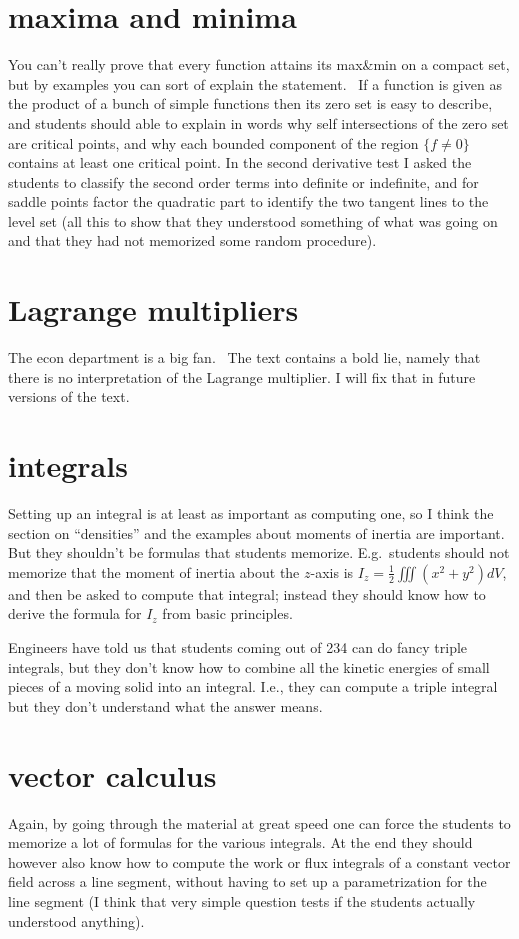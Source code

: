\documentclass[11pt]{amsbook}
\begin{document}
\section*{maxima and minima}
You can't really prove that every function attains its max\&min on a compact set,
but by examples you can sort of explain the statement.  If a function is given
as the product of a bunch of simple functions then its zero set is easy to
describe, and students should able to explain in words why self intersections of
the zero set are critical points, and why each bounded component of the region
$\{f\neq0\}$ contains at least one critical point.  In the second derivative test I
asked the students to classify the second order terms into definite or
indefinite, and for saddle points factor the quadratic part to identify the two
tangent lines to the level set (all this to show that they understood something
of what was going on and that they had not memorized some random procedure).

\section*{Lagrange multipliers}
The econ department is a big fan.  The text contains a
bold lie, namely that there is no interpretation of the Lagrange multiplier.  I
will fix that in future versions of the text.

\section*{integrals}
Setting up an integral is at least as important as computing one, so I think the
section on ``densities'' and the examples about moments of inertia are important.
But they shouldn't be formulas that students memorize.  E.g.~students should not
memorize that the moment of inertia about the $z$-axis is $I_z=\frac12\iiint
(x^2+y^2)dV$, and then be asked to compute that integral;  instead they should know
how to derive the formula for $I_z$ from basic principles.

Engineers have told us that students coming out of 234 can do fancy triple integrals,
but they don't know how to combine all the kinetic energies of small pieces of a
moving solid into an integral.  I.e., they can compute a triple integral but they
don't understand what the answer means.

\section*{vector calculus}
Again, by going through the material at great
speed one can force the students to memorize a lot of formulas for the various
integrals.  At the end they should however also know how to compute the work or flux
integrals of a constant vector field across a line segment, without having to set up
a parametrization for the line segment (I think that very simple question tests if
the students actually understood anything).
\end{document}

